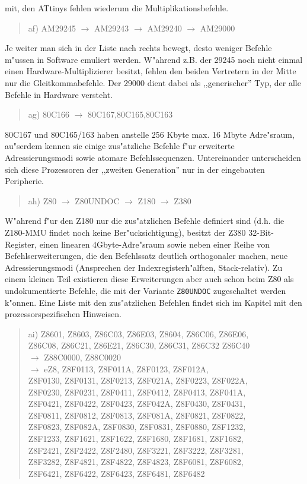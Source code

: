 \documentclass[12pt,a4paper,twoside]{report}
\newcommand{\tty}[1]{{\tt #1}}
\begin{document}
mit, den ATtinys fehlen wiederum die Multiplikationsbefehle.
\begin{quote}
af) AM29245 $\rightarrow$ AM29243 $\rightarrow$ AM29240 $\rightarrow$ AM29000
\end{quote}
Je weiter man sich in der Liste nach rechts bewegt, desto weniger
Befehle m"ussen in Software emuliert werden.  W"ahrend z.B. der 29245
noch nicht einmal einen Hardware-Multiplizierer besitzt, fehlen den
beiden Vertretern in der Mitte nur die Gleitkommabefehle.  Der 29000
dient dabei als ,,generischer'' Typ, der alle Befehle in Hardware versteht.
\begin{quote}
ag) 80C166 $\longrightarrow$ 80C167,80C165,80C163
\end{quote}
80C167 und 80C165/163 haben anstelle 256 Kbyte max. 16 Mbyte Adre"sraum,
au"serdem kennen sie einige zus"atzliche Befehle f"ur erweiterte
Adressierungsmodi sowie atomare Befehlssequenzen.  Untereinander
unterscheiden sich diese Prozessoren der ,,zweiten Generation'' nur in der
eingebauten Peripherie.
\begin{quote}
ah) Z80 $\rightarrow$ Z80UNDOC $\rightarrow$ Z180 $\rightarrow$ Z380
\end{quote}
W"ahrend f"ur den Z180 nur die zus"atzlichen Befehle definiert sind
(d.h. die Z180-MMU findet noch keine Ber"ucksichtigung), besitzt der
Z380 32-Bit-Register, einen linearen 4Gbyte-Adre"sraum sowie neben
einer Reihe von Befehlserweiterungen, die den Befehlssatz deutlich
orthogonaler machen, neue Adressierungsmodi (Ansprechen der
Indexregisterh"alften, Stack-relativ).  Zu einem kleinen Teil existieren
diese Erweiterungen aber auch schon beim Z80 als undokumentierte
Befehle, die mit der Variante \tty{Z80UNDOC} zugeschaltet werden
k"onnen.  Eine Liste mit den zus"atzlichen Befehlen findet sich im
Kapitel mit den prozessorspezifischen Hinweisen.
\begin{quote}
ai) Z8601, Z8603, Z86C03, Z86E03, Z8604, Z86C06, Z86E06, \\
    Z86C08, Z86C21, Z86E21, Z86C30, Z86C31, Z86C32 Z86C40 \\
    $\rightarrow$ Z88C0000, Z88C0020 \\
    $\rightarrow$ eZ8, Z8F0113, Z8F011A, Z8F0123, Z8F012A, \\
    Z8F0130, Z8F0131, Z8F0213, Z8F021A, Z8F0223, Z8F022A, \\
    Z8F0230, Z8F0231, Z8F0411, Z8F0412, Z8F0413, Z8F041A, \\
    Z8F0421, Z8F0422, Z8F0423, Z8F042A, Z8F0430, Z8F0431, \\
    Z8F0811, Z8F0812, Z8F0813, Z8F081A, Z8F0821, Z8F0822, \\
    Z8F0823, Z8F082A, Z8F0830, Z8F0831, Z8F0880, Z8F1232, \\
    Z8F1233, Z8F1621, Z8F1622, Z8F1680, Z8F1681, Z8F1682, \\
    Z8F2421, Z8F2422, Z8F2480, Z8F3221, Z8F3222, Z8F3281, \\
    Z8F3282, Z8F4821, Z8F4822, Z8F4823, Z8F6081, Z8F6082, \\
    Z8F6421, Z8F6422, Z8F6423, Z8F6481, Z8F6482
\end{quote}
\end{document}
